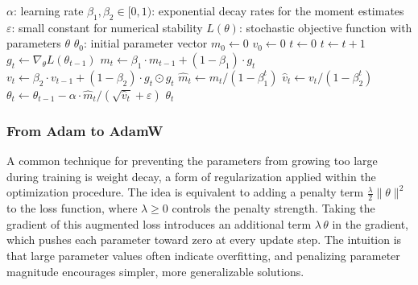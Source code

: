 \begin{algorithm}[h]
\caption{Adam optimizer \citep{Adam}.}
\label{alg:adam}
\begin{algorithmic}[1]
\Require $\alpha$: learning rate
\Require $\beta_1, \beta_2 \in [0, 1)$: exponential decay rates for the moment estimates
\Require $\varepsilon$: small constant for numerical stability
\Require $L(\theta)$: stochastic objective function with parameters $\theta$
\Require $\theta_0$: initial parameter vector
\State $m_0 \leftarrow 0$ 
\State $v_0 \leftarrow 0$ 
\State $t \leftarrow 0$ 
    \State $t \leftarrow t + 1$
    \State $g_t \leftarrow \nabla_\theta L(\theta_{t-1})$ 
    \State $m_t \leftarrow \beta_1 \cdot m_{t-1} + (1 - \beta_1) \cdot g_t$ 
    \State $v_t \leftarrow \beta_2 \cdot v_{t-1} + (1 - \beta_2) \cdot g_t \odot g_t$ 
    \State $\hat{m}_t \leftarrow m_t / (1 - \beta_1^t)$ 
    \State $\hat{v}_t \leftarrow v_t / (1 - \beta_2^t)$ 
    \State $\theta_t \leftarrow \theta_{t-1} - \alpha \cdot \hat{m}_t / (\sqrt{\hat{v}_t} + \varepsilon)$ 
\EndWhile
\State \Return $\theta_t$
\end{algorithmic}
\end{algorithm}

\subsubsection{From Adam to AdamW}
A common technique for preventing the parameters from growing too large
during training is weight decay, a form of regularization applied within
the optimization procedure. The idea is equivalent to adding a penalty
term $\frac{\lambda}{2} \|\theta\|^2$ to the loss function, where $\lambda
\geq 0$ controls the penalty strength. Taking the gradient of this
augmented loss introduces an additional term $\lambda\,\theta$ in the
gradient, which pushes each parameter toward zero at every update step.
The intuition is that large parameter values often indicate overfitting,
and penalizing parameter magnitude encourages simpler, more generalizable
solutions.

